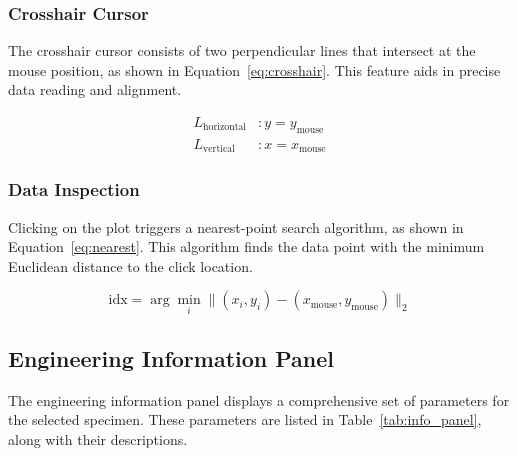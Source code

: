 \documentclass[11pt,a4paper]{article}
\begin{document}
\subsubsection{Crosshair Cursor}

The crosshair cursor consists of two perpendicular lines that intersect at the mouse position, as shown in Equation~\ref{eq:crosshair}. This feature aids in precise data reading and alignment.

\begin{equation}
\begin{aligned}
L_{\text{horizontal}} &: y = y_{\text{mouse}} \\
L_{\text{vertical}} &: x = x_{\text{mouse}}
\end{aligned}
\label{eq:crosshair}
\end{equation}

\subsubsection{Data Inspection}

Clicking on the plot triggers a nearest-point search algorithm, as shown in Equation~\ref{eq:nearest}. This algorithm finds the data point with the minimum Euclidean distance to the click location.

\begin{equation}
\text{idx} = \arg\min_i \| (x_i, y_i) - (x_{\text{mouse}}, y_{\text{mouse}}) \|_2
\label{eq:nearest}
\end{equation}

\subsection{Engineering Information Panel}

The engineering information panel displays a comprehensive set of parameters for the selected specimen. These parameters are listed in Table~\ref{tab:info_panel}, along with their descriptions.
\end{document}
